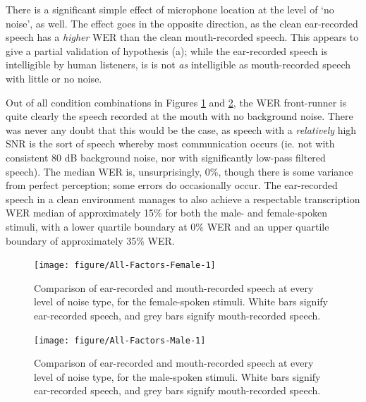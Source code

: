 There is a significant simple effect of microphone location at the level of `no noise', as well.  The effect goes in the opposite direction, as the clean ear-recorded speech has a \textit{higher} WER than the clean mouth-recorded speech.  This appears to give a partial validation of hypothesis (a); while the ear-recorded speech is intelligible by human listeners, is is not \textit{as} intelligible as mouth-recorded speech with little or no noise.

Out of all condition combinations in Figures \ref{fig:female-split} and \ref{fig:male-split}, the WER front-runner is quite clearly the speech recorded at the mouth with no background noise.  There was never any doubt that this would be the case, as speech with a \textit{relatively} high SNR is the sort of speech whereby most communication occurs (ie. not with consistent 80 dB background noise, nor with significantly low-pass filtered speech).  The median WER is, unsurprisingly, 0\%, though there is some variance from perfect perception; some errors do occasionally occur. The ear-recorded speech in a clean environment manages to also achieve a respectable transcription WER median of approximately 15\% for both the male- and female-spoken stimuli, with a lower quartile boundary at 0\% WER and an upper quartile boundary of approximately 35\% WER.


\begin{figure}[h!]
\DIFaddbeginFL \centering
\textbf{}
\DIFaddendFL 

\texttt{[image: figure/All-Factors-Female-1]} 

\caption{Comparison of ear-recorded and mouth-recorded speech at every level of noise type, for the female-spoken stimuli.  White bars signify ear-recorded speech, and grey bars signify mouth-recorded speech.}\label{fig:female-split}
\end{figure}

\begin{figure}[h!]
\DIFaddbeginFL \centering
\textbf{}
\DIFaddendFL 

\texttt{[image: figure/All-Factors-Male-1]} 

\caption{Comparison of ear-recorded and mouth-recorded speech at every level of noise type, for the male-spoken stimuli.  White bars signify ear-recorded speech, and grey bars signify mouth-recorded speech.}\label{fig:male-split}
\end{figure}


